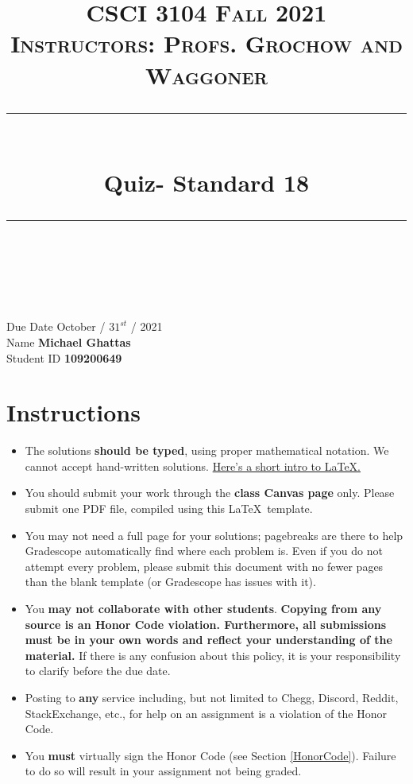 \documentclass[11pt]{article}
\title{
\normalfont \normalsize 
\textsc{CSCI 3104 Fall 2021 \\ 
Instructors: Profs. Grochow and Waggoner} \\
[10pt] 
\rule{\linewidth}{0.5pt} \\[6pt] 
\huge Quiz- Standard 18 \\
\rule{\linewidth}{2pt}  \\[10pt]
}
\date{}
\theoremstyle{definition}
\theoremstyle{definition}
\theoremstyle{definition}
\begin{document}

\maketitle


\noindent
Due Date \dotfill October / $31^{st}$ / 2021 \\
Name \dotfill \textbf{Michael Ghattas} \\
Student ID \dotfill \textbf{109200649} \\


\tableofcontents

\section{Instructions}
 \begin{itemize}
	\item The solutions \textbf{should be typed}, using proper mathematical notation. We cannot accept hand-written solutions. \href{http://ece.uprm.edu/~caceros/latex/introduction.pdf}{Here's a short intro to \LaTeX.}
	\item You should submit your work through the \textbf{class Canvas page} only. Please submit one PDF file, compiled using this \LaTeX \ template.
	\item You may not need a full page for your solutions; pagebreaks are there to help Gradescope automatically find where each problem is. Even if you do not attempt every problem, please submit this document with no fewer pages than the blank template (or Gradescope has issues with it).

	\item You \textbf{may not collaborate with other students}. \textbf{Copying from any source is an Honor Code violation. Furthermore, all submissions must be in your own words and reflect your understanding of the material.} If there is any confusion about this policy, it is your responsibility to clarify before the due date. 

	\item Posting to \textbf{any} service including, but not limited to Chegg, Discord, Reddit, StackExchange, etc., for help on an assignment is a violation of the Honor Code.

	\item You \textbf{must} virtually sign the Honor Code (see Section \ref{HonorCode}). Failure to do so will result in your assignment not being graded.
\end{itemize}
\end{document}
